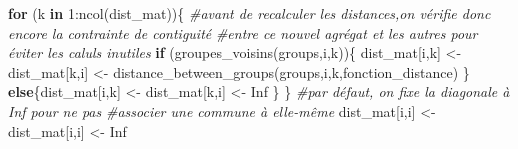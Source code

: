 \documentclass[
]{article}
\newenvironment{Shaded}{\begin{snugshade}}{\end{snugshade}}
\newcommand{\CommentTok}[1]{\textcolor[rgb]{0.56,0.35,0.01}{\textit{#1}}}
\newcommand{\ConstantTok}[1]{\textcolor[rgb]{0.00,0.00,0.00}{#1}}
\newcommand{\ControlFlowTok}[1]{\textcolor[rgb]{0.13,0.29,0.53}{\textbf{#1}}}
\newcommand{\DecValTok}[1]{\textcolor[rgb]{0.00,0.00,0.81}{#1}}
\newcommand{\FunctionTok}[1]{\textcolor[rgb]{0.00,0.00,0.00}{#1}}
\newcommand{\NormalTok}[1]{#1}
\newcommand{\OtherTok}[1]{\textcolor[rgb]{0.56,0.35,0.01}{#1}}
\newcommand{\SpecialCharTok}[1]{\textcolor[rgb]{0.00,0.00,0.00}{#1}}
\begin{document}
\begin{Shaded}
\begin{Highlighting}[]
      \ControlFlowTok{for}\NormalTok{ (k }\ControlFlowTok{in} \DecValTok{1}\SpecialCharTok{:}\FunctionTok{ncol}\NormalTok{(dist\_mat))\{}
        \CommentTok{\#avant de recalculer les distances,on vérifie donc encore la contrainte de contiguité }
        \CommentTok{\#entre ce nouvel agrégat et les autres pour éviter les caluls inutiles}
        \ControlFlowTok{if}\NormalTok{ (}\FunctionTok{groupes\_voisins}\NormalTok{(groups,i,k))\{}
\NormalTok{          dist\_mat[i,k] }\OtherTok{\textless{}{-}}\NormalTok{ dist\_mat[k,i] }\OtherTok{\textless{}{-}} \FunctionTok{distance\_between\_groups}\NormalTok{(groups,i,k,fonction\_distance)}
\NormalTok{        \}}
        \ControlFlowTok{else}\NormalTok{\{dist\_mat[i,k] }\OtherTok{\textless{}{-}}\NormalTok{ dist\_mat[k,i] }\OtherTok{\textless{}{-}} \ConstantTok{Inf}
\NormalTok{        \}}
\NormalTok{      \}}
      \CommentTok{\#par défaut, on fixe la diagonale à Inf pour ne pas }
      \CommentTok{\#associer une commune à elle{-}même}
\NormalTok{      dist\_mat[i,i] }\OtherTok{\textless{}{-}}\NormalTok{ dist\_mat[i,i] }\OtherTok{\textless{}{-}} \ConstantTok{Inf}
      

\end{Highlighting}
\end{Shaded}
\end{document}
